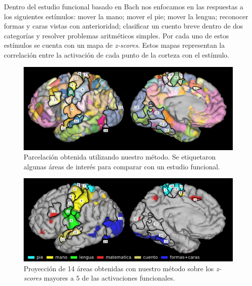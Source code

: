 Dentro del estudio funcional basado en Bach \cite{Barch2013} nos
enfocamos en las respuestas a los siguientes est\'imulos: mover la mano;
mover el pie; mover la lengua; reconocer formas y caras vistas con
anterioridad; clasificar un cuento breve dentro de dos categor\'ias y
resolver problemas aritm\'eticos simples. Por cada uno de estos est\'imulos
se cuenta con un mapa de \textit{z-scores}. Estos mapas representan la
correlaci\'on entre la activaci\'on de cada punto de la corteza con el 
est\'imulo. \\

\begin{figure}[h!]
    \includegraphics[width=\textwidth]{img/32k_labels.png}
    \caption{Parcelaci\'on obtenida utilizando nuestro m\'etodo. Se 
             etiquetaron algunas \'areas de inter\'es para comparar
             con un estudio funcional.}
    \label{fig:32k}
\end{figure}


\begin{figure}[h!]
    \includegraphics[width=\textwidth]{img/32k_z5.png}
    \caption{Proyecci\'on de 14 \'areas obtenidas con nuestro m\'etodo
             sobre los \textit{z-scores} mayores a $5$ de las activaciones
             funcionales.}
    \label{fig:32k_z5}
\end{figure}

